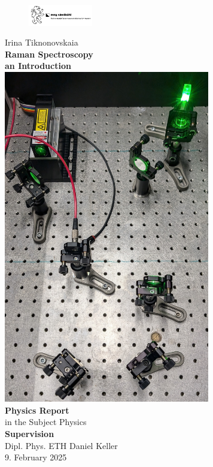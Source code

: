 \documentclass[a4paper]{article}
\date{November 2024}
\begin{document}

\begin{figure}
    \includegraphics[width=0.25\textwidth]{images/MNG_pic.png}
\end{figure}
\begin{center}
    \large
    Irina Tiknonovskaia\\
    \Huge \textbf{Raman Spectroscopy}\\
    \huge \textbf{an Introduction}
    \\[0.4cm]
    \includegraphics[width=9cm]{images/active_setup_photo.jpg}
    \\[0.4cm]
    \large
    \textbf{Physics Report}\\
    in the Subject Physics
    \\[0.25cm]
    \textbf{Supervision}\\
    Dipl. Phys. ETH Daniel Keller\\
    9. February 2025
\end{center}
\newpage
{}
\end{document}
